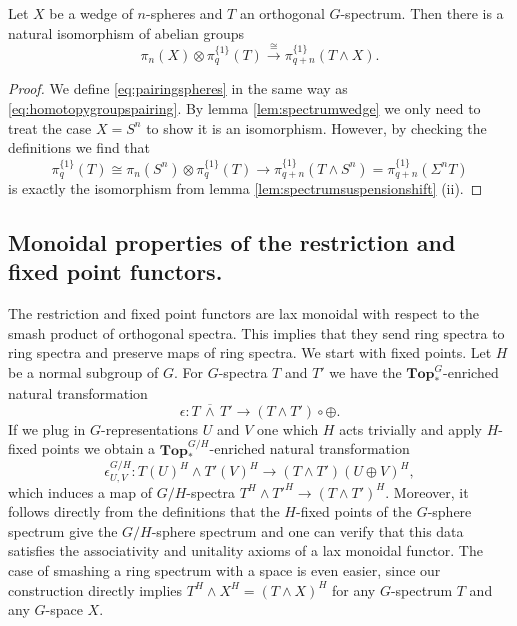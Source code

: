 \begin{lem}\label{lem:pairing}
Let $X$ be a wedge of $n$-spheres and $T$ an orthogonal $G$-spectrum. 
Then there is a natural isomorphism of abelian groups
\begin{equation}\label{eq:pairingspheres}
\pi_{n}(X)\otimes \pi_q^{\{1\}}(T)\xrightarrow{\cong} \pi_{ q + n}^{\{1\}}(T\wedge X).
\end{equation}
\end{lem}
\begin{proof}
We define \eqref{eq:pairingspheres} in the same way as \eqref{eq:homotopygroupspairing}.
By lemma \ref{lem:spectrumwedge} we only need to treat the case $X = S^n$
to show it is an isomorphism. However, by checking the definitions we find
that 
\[
\pi_q^{\{1\}}(T)\cong \pi_n(S^n)\otimes \pi_q^{\{1\}}(T)\to \pi_{q+n}^{\{1\}} (T\wedge S^n) =  \pi_{q+n}^{\{1\}} (\Sigma^n T)
\]
is exactly the isomorphism from lemma \ref{lem:spectrumsuspensionshift} (ii).
\end{proof}
\subsection{Monoidal properties of the restriction and fixed point functors.}
The restriction and fixed point functors are lax monoidal
with respect to the smash product of orthogonal spectra.
This implies that they send ring spectra to ring spectra
and preserve maps of ring spectra. We start with fixed points.
Let $H$ be a normal subgroup of $G$. For $G$-spectra
$T$ and $T'$ we have the
$\mathbf{Top}_{\ast}^G$-enriched natural transformation
\[
\epsilon:T\,\overline{\wedge}\, T'\to (T\wedge T')\circ\oplus.
\]
If we plug in $G$-representations $U$ and $V$ one which
$H$ acts trivially and apply $H$-fixed points we obtain
a $\mathbf{Top}_{\ast}^{G/H}$-enriched natural transformation
\[
\epsilon^{G/H}_{U,V}:T(U)^H\wedge T'(V)^H\to (T\wedge T')(U\oplus V)^H, 
\]
which induces a map of $G/H$-spectra $T^H\wedge T'^H\to (T\wedge T')^H$.
Moreover, it follows directly from the definitions that the $H$-fixed points
of the $G$-sphere spectrum give the $G/H$-sphere spectrum and one can 
verify that this data satisfies the associativity and unitality axioms
of a lax monoidal functor.
The case of smashing a ring spectrum with a space is even easier,
since our construction directly implies $T^H\wedge X^H = (T\wedge X)^H$
for any $G$-spectrum $T$ and any $G$-space $X$.


